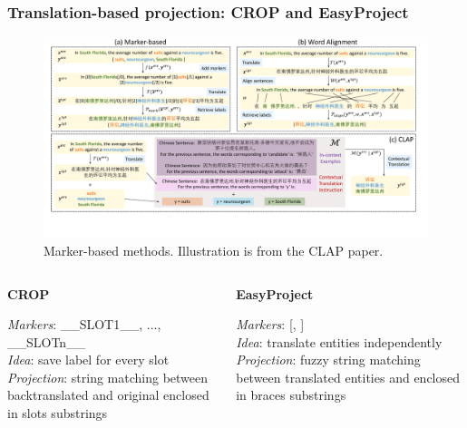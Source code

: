 \documentclass{beamer}
\begin{document}
\begin{frame}
  \frametitle{Translation-based projection: CROP and EasyProject}
  \begin{figure}
    \includegraphics[height=0.4\textheight, clip, trim=0cm 10.7cm 24.5cm 1cm]{ClAP_marker_align.pdf}
    \caption{Marker-based methods. Illustration is from the CLAP paper.}
  \end{figure}
  \begin{columns}
    \begin{column}[t]{0.5\textwidth}
      \centering \textbf{CROP} \\
      \begin{flushleft}
        \textit{Markers}: \_\_SLOT1\_\_, ..., \_\_SLOTn\_\_ \\
        \textit{Idea}: save label for every slot
        \textit{Projection}: string matching between backtranslated and original enclosed in slots substrings
      \end{flushleft}
    \end{column}
    \begin{column}[t]{0.5\textwidth}
      \centering \textbf{EasyProject} \\
      \begin{flushleft}
        \textit{Markers}: [, ] \\
        \textit{Idea}: translate entities independently
        \textit{Projection}: fuzzy string matching between translated entities and
        enclosed in braces substrings
      \end{flushleft}
    \end{column}
  \end{columns}
\end{frame}
\end{document}
